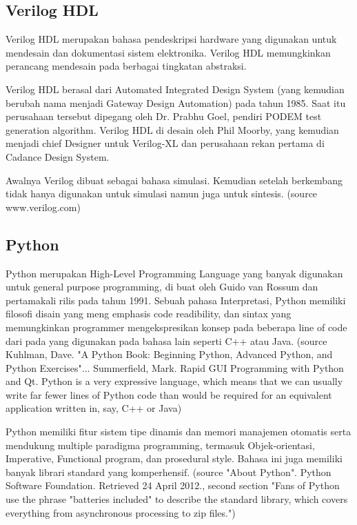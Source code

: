 \subsection{Verilog HDL}
Verilog HDL merupakan bahasa pendeskripsi hardware yang digunakan untuk mendesain dan dokumentasi sistem elektronika. Verilog HDL memungkinkan perancang mendesain pada berbagai tingkatan abstraksi.

Verilog HDL berasal dari Automated Integrated Design System (yang kemudian berubah nama menjadi Gateway Design Automation) pada tahun 1985. Saat itu perusahaan tersebut dipegang oleh Dr. Prabhu Goel, pendiri PODEM test generation algorithm. Verilog HDL di desain oleh Phil Moorby, yang kemudian menjadi chief Designer untuk Verilog-XL dan perusahaan rekan pertama di Cadance Design System. 

Awalnya Verilog dibuat sebagai bahasa simulasi. Kemudian setelah berkembang tidak hanya digunakan untuk simulasi namun juga untuk sintesis. (source www.verilog.com)

\subsection{Python}
Python merupakan High-Level Programming Language yang banyak digunakan untuk general purpose programming, di buat oleh Guido van Rossum dan pertamakali rilis pada tahun 1991. Sebuah pahasa Interpretasi, Python memiliki filosofi disain yang meng emphasis code readibility, dan sintax yang memungkinkan programmer mengekspresikan konsep pada beberapa line of code dari pada yang digunakan pada bahasa lain seperti C++ atau Java. (source Kuhlman, Dave. "A Python Book: Beginning Python, Advanced Python, and Python Exercises"... Summerfield, Mark. Rapid GUI Programming with Python and Qt. Python is a very expressive language, which means that we can usually write far fewer lines of Python code than would be required for an equivalent application written in, say, C++ or Java)

Python memiliki fitur sistem tipe dinamis dan memori manajemen otomatis serta mendukung multiple paradigma programming, termasuk Objek-orientasi, Imperative, Functional program, dan prosedural style. Bahasa ini juga memiliki banyak librari standard yang komperhensif. (source "About Python". Python Software Foundation. Retrieved 24 April 2012., second section "Fans of Python use the phrase "batteries included" to describe the standard library, which covers everything from asynchronous processing to zip files.")


